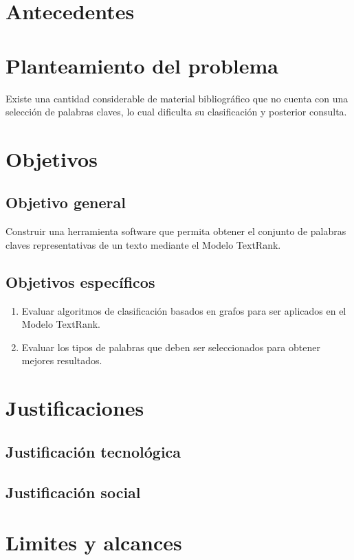 \section{Antecedentes}


\section{Planteamiento del problema}
Existe una cantidad considerable de material bibliogr\'afico que no cuenta con una
selecci\'on de palabras claves, lo cual dificulta su clasificaci\'on y posterior
consulta.

\section{Objetivos}

\subsection{Objetivo general}
Construir una herramienta software que permita obtener el conjunto de palabras claves
representativas de un texto mediante el Modelo TextRank.

\subsection{Objetivos espec\'ificos}
\begin{enumerate}
	\item Evaluar algoritmos de clasificaci\'on basados en grafos para ser aplicados en el
	Modelo TextRank.
	\item Evaluar los tipos de palabras que deben ser seleccionados para obtener mejores
	resultados.
\end{enumerate}

\section{Justificaciones}
\subsection{Justificaci\'on tecnol\'ogica}
\subsection{Justificaci\'on social}



\section{Limites y alcances}

